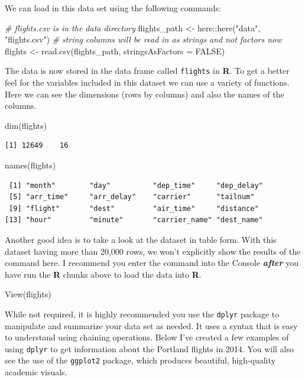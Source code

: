 \documentclass[12pt,twoside]{reedthesis}
\newenvironment{Shaded}{\begin{snugshade}}{\end{snugshade}}
\newcommand{\AttributeTok}[1]{\textcolor[rgb]{0.77,0.63,0.00}{#1}}
\newcommand{\CommentTok}[1]{\textcolor[rgb]{0.56,0.35,0.01}{\textit{#1}}}
\newcommand{\ConstantTok}[1]{\textcolor[rgb]{0.00,0.00,0.00}{#1}}
\newcommand{\FunctionTok}[1]{\textcolor[rgb]{0.00,0.00,0.00}{#1}}
\newcommand{\NormalTok}[1]{#1}
\newcommand{\OtherTok}[1]{\textcolor[rgb]{0.56,0.35,0.01}{#1}}
\newcommand{\SpecialCharTok}[1]{\textcolor[rgb]{0.00,0.00,0.00}{#1}}
\newcommand{\StringTok}[1]{\textcolor[rgb]{0.31,0.60,0.02}{#1}}
\begin{document}
We can load in this data set using the following commands:
\begin{Shaded}
\begin{Highlighting}[]
\CommentTok{\# flights.csv is in the data directory}
\NormalTok{flights\_path }\OtherTok{\textless{}{-}}\NormalTok{ here}\SpecialCharTok{::}\FunctionTok{here}\NormalTok{(}\StringTok{"data"}\NormalTok{, }\StringTok{"flights.csv"}\NormalTok{)}
\CommentTok{\# string columns will be read in as strings and not factors now}
\NormalTok{flights }\OtherTok{\textless{}{-}} \FunctionTok{read.csv}\NormalTok{(flights\_path, }\AttributeTok{stringsAsFactors =} \ConstantTok{FALSE}\NormalTok{)}
\end{Highlighting}
\end{Shaded}
The data is now stored in the data frame called \texttt{flights} in \textbf{R}. To get a better feel for the variables included in this dataset we can use a variety of functions. Here we can see the dimensions (rows by columns) and also the names of the columns.
\begin{Shaded}
\begin{Highlighting}[]
\FunctionTok{dim}\NormalTok{(flights)}
\end{Highlighting}
\end{Shaded}
\begin{verbatim}
[1] 12649    16
\end{verbatim}
\begin{Shaded}
\begin{Highlighting}[]
\FunctionTok{names}\NormalTok{(flights)}
\end{Highlighting}
\end{Shaded}
\begin{verbatim}
 [1] "month"        "day"          "dep_time"     "dep_delay"   
 [5] "arr_time"     "arr_delay"    "carrier"      "tailnum"     
 [9] "flight"       "dest"         "air_time"     "distance"    
[13] "hour"         "minute"       "carrier_name" "dest_name"   
\end{verbatim}
Another good idea is to take a look at the dataset in table form. With this dataset having more than 20,000 rows, we won't explicitly show the results of the command here. I recommend you enter the command into the Console \textbf{\emph{after}} you have run the \textbf{R} chunks above to load the data into \textbf{R}.
\begin{Shaded}
\begin{Highlighting}[]
\FunctionTok{View}\NormalTok{(flights)}
\end{Highlighting}
\end{Shaded}
While not required, it is highly recommended you use the \texttt{dplyr} package to manipulate and summarize your data set as needed. It uses a syntax that is easy to understand using chaining operations. Below I've created a few examples of using \texttt{dplyr} to get information about the Portland flights in 2014. You will also see the use of the \texttt{ggplot2} package, which produces beautiful, high-quality academic visuals.
\end{document}

